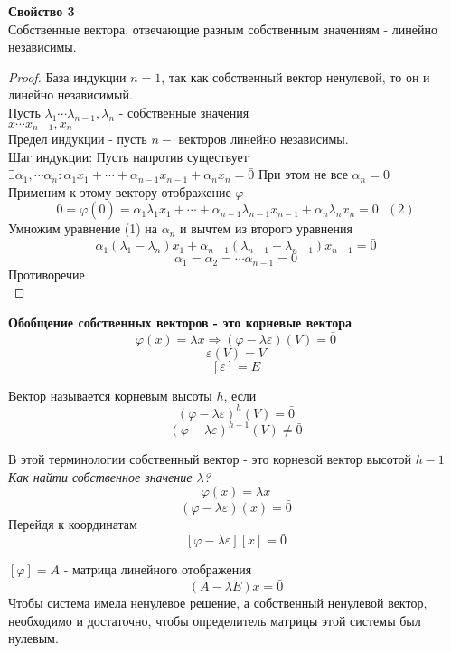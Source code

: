 {\bf Свойство 3}\\
Собственные вектора, отвечающие разным собственным значениям - линейно
независимы.\\
\begin{proof}
База индукции $n = 1$, так как собственный вектор ненулевой, то он и линейно
независимый.\\
Пусть $\lambda_1 \cdots \lambda_{n-1}, \lambda_n$ - собственные значения\\
$x \cdots x_{n-1}, x_n$\\
Предел индукции - пусть $n - $ векторов линейно независимы.\\
Шаг индукции: Пусть напротив существует\\
$\exists \alpha_1, \cdots \alpha_n: \alpha_1 x_1 + \cdots + \alpha_{n-1} x_{n-1}
+ \alpha_n x_n = \bar{0}$ При этом не все $\alpha_n = 0$\\
Применим к этому вектору отображение $\varphi$\\
\[\bar{0} = \varphi(\bar{0}) = \alpha_1 \lambda_1 x_1 + \cdots + \alpha_{n-1}
\lambda_{n-1} x_{n-1} + \alpha_n \lambda_n x_n = \bar{0} ~~~ (2)\]
Умножим уравнение (1) на $\alpha_n$ и вычтем из второго уравнения\\
\[\alpha_1 (\lambda_1 - \lambda_n)x_1 + \alpha_{n-1} (\lambda_{n-1} -
\lambda_{n-1})x_{n-1} = \bar{0}\]
\[\alpha_1 = \alpha_2 = \cdots \alpha_{n-1} = 0\]
Противоречие\\
\end{proof}

{\bf Обобщение собственных векторов - это корневые вектора}\\
\[\varphi(x) = \lambda x \Rightarrow (\varphi - \lambda \varepsilon)(V) = \bar{0}\]
\[\varepsilon (V) = V\]
\[[\varepsilon] = E\]

\begin{defin}
Вектор называется корневым высоты $h$, если
\[(\varphi - \lambda \varepsilon)^h (V) = \bar{0}\]
\[(\varphi - \lambda \varepsilon)^{h - 1} (V) \ne \bar{0}\]
\end{defin}

В этой терминологии собственный вектор - это корневой вектор высотой $h - 1$\\

\emph{Как найти собственное значение $\lambda$?}\\
\[\varphi (x) = \lambda x\]
\[(\varphi - \lambda \varepsilon)(x) = \bar{0}\]
Перейдя к координатам
\[[\varphi - \lambda \varepsilon][x] = \bar{0}\]

$[\varphi] = A$ - матрица линейного отображения\\
\[(A - \lambda E) x = \bar{0}\]
Чтобы система имела ненулевое решение, а собственный ненулевой вектор,
необходимо и достаточно, чтобы определитель матрицы этой системы был нулевым.\\

